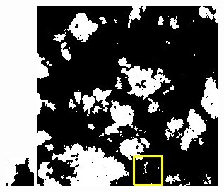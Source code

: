 \documentclass[10pt]{ctexart}
\begin{document}
\begin{multicols}{2}
\begin{figure}[H]
{\begin{minipage}[b]{0.15\linewidth}
            \includegraphics[width=1\linewidth]{../log/spoon2/cut/tmp_cut_LC80350192014190LGN00_06561_mask.jpg}\vspace{4pt}
            \includegraphics[width=1\linewidth]{../log/spoon2/cut/LC80980712014024LGN00_15443_mask.jpg}\vspace{4pt}

\end{minipage}}
\end{figure}
\end{multicols}
\end{document}
